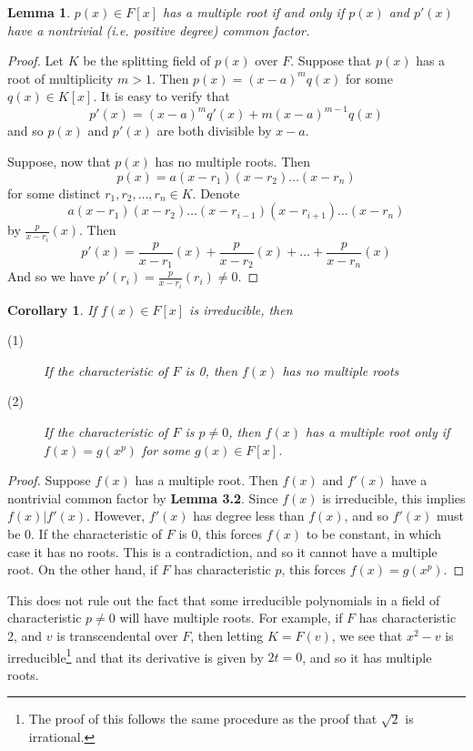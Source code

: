 \documentclass[12pt,leqno]{article}
\numberwithin{equation}{section}
\theoremstyle{plain}
\newtheorem{lem}[thm]{Lemma}
\newtheorem{cor}[thm]{Corollary}
\theoremstyle{definition}
\theoremstyle{remark}
\begin{document}
\begin{lem}
 $p(x)\in F[x]$ has a multiple root if and only if $p(x)$ and $p'(x)$ have a nontrivial (i.e. positive degree) common factor.
\end{lem}

\begin{proof}
 Let $K$ be the splitting field of $p(x)$ over $F$. Suppose that $p(x)$ has a root of multiplicity $m>1$. Then $p(x)=(x-a)^mq(x)$ for some $q(x)\in K[x]$. It is easy to verify that \[p'(x)=(x-a)^mq'(x)+m(x-a)^{m-1}q(x)\] and so $p(x)$ and $p'(x)$ are both divisible by $x-a$.

Suppose, now that $p(x)$ has no multiple roots. Then \[p(x)=a(x-r_1)(x-r_2)\hdots(x-r_n)\] for some distinct $r_1,r_2,\hdots,r_n\in K$. Denote \[a(x-r_1)(x-r_2)\hdots(x-r_{i-1})(x-r_{i+1})\hdots(x-r_n)\] by $\frac{p}{x-r_i}(x)$. Then \[p'(x)=\frac{p}{x-r_1}(x)+\frac{p}{x-r_2}(x)+\hdots+\frac{p}{x-r_n}(x)\] And so we have $p'(r_i)=\frac{p}{x-r_i}(r_i)\not=0$.
\end{proof}

\begin{cor}
 If $f(x)\in F[x]$ is irreducible, then
\begin{description}
 \item [(1)] If the characteristic of $F$ is 0, then $f(x)$ has no multiple roots
 \item [(2)] If the characteristic of $F$ is $p\not=0$, then $f(x)$ has a multiple root only if $f(x)=g(x^p)$ for some $g(x)\in F[x]$.
\end{description}
\end{cor}

\begin{proof}
Suppose $f(x)$ has a multiple root. Then $f(x)$ and $f'(x)$ have a nontrivial common factor by \textbf{Lemma 3.2}. Since $f(x)$ is irreducible, this implies $f(x)|f'(x)$. However, $f'(x)$ has degree less than $f(x)$, and so $f'(x)$ must be 0. If the characteristic of $F$ is 0, this forces $f(x)$ to be constant, in which case it has no roots. This is a contradiction, and so it cannot have a multiple root. On the other hand, if $F$ has characteristic $p$, this forces $f(x)=g(x^p)$.
\end{proof}

This does not rule out the fact that some irreducible polynomials in a field of characteristic $p\not=0$ will have multiple roots. For example, if $F$ has characteristic 2, and $v$ is transcendental over $F$, then letting $K=F(v)$, we see that $x^2-v$ is irreducible\footnote{The proof of this follows the same procedure as the proof that $\sqrt{2}$ is irrational.} and that its derivative is given by $2t=0$, and so it has multiple roots.
\end{document}
